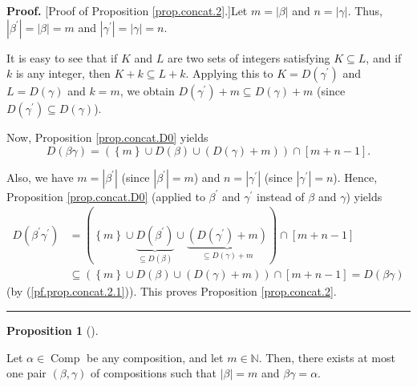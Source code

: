 \documentclass[numbers=enddot,12pt,final,onecolumn,notitlepage]{scrartcl}%
\theoremstyle{definition}
\newtheorem{prop}[theo]{Proposition}
\newenvironment{proposition}[1][]
{\begin{prop}[#1]\begin{leftbar}}
{\end{leftbar}\end{prop}}
\newenvironment{proof}[1][Proof]{\noindent\textbf{#1.} }{\ \rule{0.5em}{0.5em}}
\begin{document}
\begin{proof}
[Proof of Proposition \ref{prop.concat.2}.]Let $m=\left\vert \beta\right\vert
$ and $n=\left\vert \gamma\right\vert $. Thus, $\left\vert \beta^{\prime
}\right\vert =\left\vert \beta\right\vert =m$ and $\left\vert \gamma^{\prime
}\right\vert =\left\vert \gamma\right\vert =n$.

It is easy to see that if $K$ and $L$ are two sets of integers satisfying
$K\subseteq L$, and if $k$ is any integer, then $K+k\subseteq L+k$. Applying
this to $K=D\left(  \gamma^{\prime}\right)  $ and $L=D\left(  \gamma\right)  $
and $k=m$, we obtain $D\left(  \gamma^{\prime}\right)  +m\subseteq D\left(
\gamma\right)  +m$ (since $D\left(  \gamma^{\prime}\right)  \subseteq D\left(
\gamma\right)  $).

Now, Proposition \ref{prop.concat.D0} yields%
\begin{equation}
D\left(  \beta\gamma\right)  =\left(  \left\{  m\right\}  \cup D\left(
\beta\right)  \cup\left(  D\left(  \gamma\right)  +m\right)  \right)
\cap\left[  m+n-1\right]  . \label{pf.prop.concat.2.1}%
\end{equation}


Also, we have $m=\left\vert \beta^{\prime}\right\vert $ (since $\left\vert
\beta^{\prime}\right\vert =m$) and $n=\left\vert \gamma^{\prime}\right\vert $
(since $\left\vert \gamma^{\prime}\right\vert =n$). Hence, Proposition
\ref{prop.concat.D0} (applied to $\beta^{\prime}$ and $\gamma^{\prime}$
instead of $\beta$ and $\gamma$) yields%
\begin{align*}
D\left(  \beta^{\prime}\gamma^{\prime}\right)   &  =\left(  \left\{
m\right\}  \cup\underbrace{D\left(  \beta^{\prime}\right)  }_{\subseteq
D\left(  \beta\right)  }\cup\underbrace{\left(  D\left(  \gamma^{\prime
}\right)  +m\right)  }_{\subseteq D\left(  \gamma\right)  +m}\right)
\cap\left[  m+n-1\right] \\
&  \subseteq\left(  \left\{  m\right\}  \cup D\left(  \beta\right)
\cup\left(  D\left(  \gamma\right)  +m\right)  \right)  \cap\left[
m+n-1\right]  =D\left(  \beta\gamma\right)
\end{align*}
(by (\ref{pf.prop.concat.2.1})). This proves Proposition \ref{prop.concat.2}.
\end{proof}

\begin{proposition}
\label{prop.concat.4u}Let $\alpha\in\operatorname*{Comp}$ be any composition,
and let $m\in\mathbb{N}$. Then, there exists at most one pair $\left(
\beta,\gamma\right)  $ of compositions such that $\left\vert \beta\right\vert
=m$ and $\beta\gamma=\alpha$.
\end{proposition}
\end{document}
